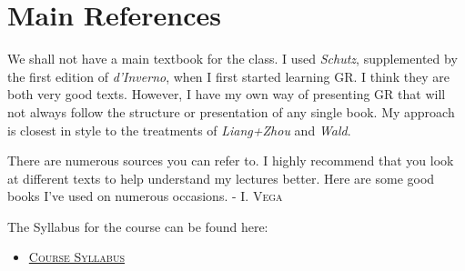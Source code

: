 \section*{Main References}

We shall not have a main textbook for the class. I used \textit{Schutz}, supplemented by the first edition of \textit{d’Inverno},
when I first started learning GR. I think they are both very good texts. However, I have my own way of
presenting GR that will not always follow the structure or presentation of any single book. My approach is
closest in style to the treatments of \textit{Liang+Zhou} and \textit{Wald}.

There are numerous sources you can refer to. I highly recommend that you look at different texts to help
understand my lectures better. Here are some good books I’ve used on numerous occasions. - \textsc{I. Vega}


The Syllabus for the course can be found here:
\begin{itemize}
    \item[
        \href{run:C:/Users/verci/Documents/code/Class Notes - V/Physics 225/syllabus/syllabus_ps225_2025.pdf
		}{$\blacksquare$}
    ] 
	\textsc{\href{https://mail.google.com/mail/u/1/inbox
	}{Course Syllabus}}
\end{itemize}


